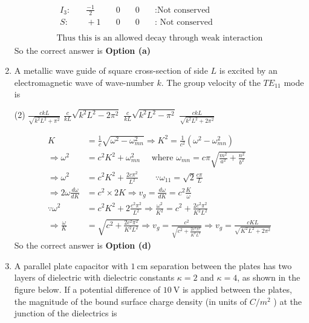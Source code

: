 \begin{enumerate}
\begin{answer}
\begin{align*}
\begin{array}{lllll}
I_{3}: &\quad \frac{-1}{2} &\quad 0 &\quad 0 &\quad: \text{Not conserved}\\
S: &\quad+1 &\quad 0 &\quad 0 &\quad: \text{ Not conserved}
\end{array}\\\\
\text{Thus this is an allowed decay through weak interaction}
	\end{align*}
		So the correct answer is \textbf{Option (a)}
\end{answer}
\item A metallic wave guide of square cross-section of side $L$ is excited by an electromagnetic wave of wave-number $k$. The group velocity of the $T E_{11}$ mode is
 \begin{tasks}(2)
	\task[\textbf{a.}]$\frac{c k L}{\sqrt{k^{2} L^{2}+\pi^{2}}}$
	\task[\textbf{b.}]$\frac{c}{k L} \sqrt{k^{2} L^{2}-2 \pi^{2}}$
	\task[\textbf{c.}]$\frac{c}{k L} \sqrt{k^{2} L^{2}-\pi^{2}}$
	\task[\textbf{d.}]  $\frac{c k L}{\sqrt{k^{2} L^{2}+2 \pi^{2}}}$
\end{tasks}
\begin{answer}
	\begin{align*}
	K&=\frac{1}{c} \sqrt{\omega^{2}-\omega_{m n}^{2}} \Rightarrow K^{2}=\frac{1}{c^{2}}\left(\omega^{2}-\omega_{m n}^{2}\right)\\
	\Rightarrow \omega^{2}&=c^{2} K^{2}+\omega_{m n}^{2} \quad \text { where } \omega_{m n}=c \pi \sqrt{\frac{m^{2}}{a^{2}}+\frac{n^{2}}{b^{2}}} \\
	\Rightarrow \omega^{2}&=c^{2} K^{2}+\frac{2 c \pi^{2}}{L^{2}} \qquad \because \omega_{11}=\sqrt{2} \frac{c \pi}{L}\\
	\Rightarrow 2 \omega \frac{d \omega}{d K}&=c^{2} \times 2 K \Rightarrow v_{g}=\frac{d \omega}{d K}=c^{2} \frac{K}{\omega} \\
	\because \omega^{2}&=c^{2} K^{2}+2 \frac{c^{2} \pi^{2}}{L^{2}} \Rightarrow \frac{\omega^{2}}{K^{2}}=c^{2}+\frac{2 c^{2} \pi^{2}}{K^{2} L^{2}} \\
	\Rightarrow \frac{\omega}{K}&=\sqrt{c^{2}+\frac{2 c^{2} \pi^{2}}{K^{2} L^{2}}} \Rightarrow v_{g}=\frac{c^{2}}{\sqrt{c^{2}+\frac{2 c^{2} \pi^{2}}{K^{2} L^{2}}}} \Rightarrow v_{g}=\frac{c K L}{\sqrt{K^{2} L^{2}+2 \pi^{2}}}
	\end{align*}
		So the correct answer is \textbf{Option (d)}
\end{answer}
\item A parallel plate capacitor with $1 \mathrm{~cm}$ separation between the plates has two layers of dielectric with dielectric constants $\kappa=2$ and $\kappa=4$, as shown in the figure below. If a potential difference of $10 \mathrm{~V}$ is applied between the plates, the magnitude of the bound surface charge density (in units of $C / m^{2}$ ) at the junction of the dielectrics is

\end{enumerate}
